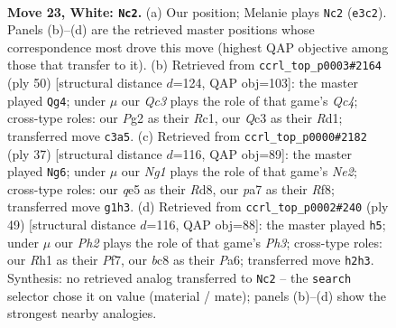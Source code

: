 \documentclass[11pt]{article}
\begin{document}
\clearpage

\begin{figure}[p]\centering
\begin{subfigure}{0.46\textwidth}\centering
\resizebox{\linewidth}{!}{%
\newchessgame
\chessboard[
  setfen={r1b2k2/pp3pp1/n3p3/3pq3/3nr3/PPQ1N3/6PP/R2K2NR w - - 2 23},
  showmover=false,
  pgfstyle=straightmove, color=movearrow, markmove={e3-c2}
]}
\caption{}
\end{subfigure}\hfill
\begin{subfigure}{0.46\textwidth}\centering
\resizebox{\linewidth}{!}{%
\newchessgame
\chessboard[
  setfen={2rr2k1/pq4pp/1p2p3/1NbnN3/2Q5/1P2P3/P4P1P/2RR2K1 w - - 0 26},
  showmover=false,
  pgfstyle=straightmove, color=movearrow, markmove={c4-g4}
]}
\caption{}
\end{subfigure}
\\[4pt]
\begin{subfigure}{0.46\textwidth}\centering
\resizebox{\linewidth}{!}{%
\newchessgame
\chessboard[
  setfen={3r1rk1/pp2n1p1/2q1p2p/8/3nN3/P2Q3N/1PP2PPP/2R2R1K b - - 13 19},
  showmover=false,
  pgfstyle=straightmove, color=movearrow, markmove={e7-g6}
]}
\caption{}
\end{subfigure}\hfill
\begin{subfigure}{0.46\textwidth}\centering
\resizebox{\linewidth}{!}{%
\newchessgame
\chessboard[
  setfen={4r1k1/1p3p2/pq1p2pp/4r3/3Nn3/1P1Q3P/1PP2PP1/3RR1K1 b - - 1 25},
  showmover=false,
  pgfstyle=straightmove, color=movearrow, markmove={h6-h5}
]}
\caption{}
\end{subfigure}
\caption{\textbf{Move 23, White: \texttt{Nc2}.} (a) Our position; Melanie plays \texttt{Nc2} (\texttt{e3c2}). Panels (b)--(d) are the retrieved master positions whose correspondence most drove this move (highest QAP objective among those that transfer to it). (b) Retrieved from \texttt{ccrl\_top\_p0003\#2164} (ply 50) [structural distance $d$=124, QAP obj=103]: the master played \texttt{Qg4}; under $\mu$ our \emph{Qc3} plays the role of that game's \emph{Qc4}; cross-type roles: our \emph{P}g2 as their \emph{R}c1, our \emph{Q}c3 as their \emph{R}d1; transferred move \texttt{c3a5}. (c) Retrieved from \texttt{ccrl\_top\_p0000\#2182} (ply 37) [structural distance $d$=116, QAP obj=89]: the master played \texttt{Ng6}; under $\mu$ our \emph{Ng1} plays the role of that game's \emph{Ne2}; cross-type roles: our \emph{q}e5 as their \emph{R}d8, our \emph{p}a7 as their \emph{R}f8; transferred move \texttt{g1h3}. (d) Retrieved from \texttt{ccrl\_top\_p0002\#240} (ply 49) [structural distance $d$=116, QAP obj=88]: the master played \texttt{h5}; under $\mu$ our \emph{Ph2} plays the role of that game's \emph{Ph3}; cross-type roles: our \emph{R}h1 as their \emph{P}f7, our \emph{b}c8 as their \emph{P}a6; transferred move \texttt{h2h3}. Synthesis: no retrieved analog transferred to \texttt{Nc2} -- the \texttt{search} selector chose it on value (material / mate); panels (b)--(d) show the strongest nearby analogies.}
\label{fig:thought-m44}
\end{figure}
\end{document}
